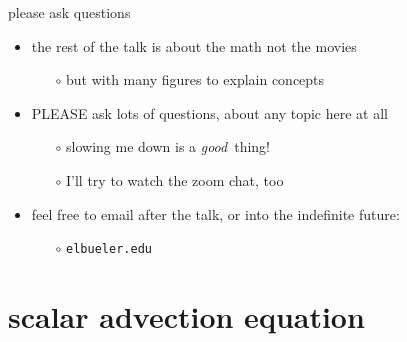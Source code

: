 \documentclass[10pt,dvipsnames,usepdftitle=false,
hyperref={pdftitle = {Finite volume methods},
    pdfauthor = {Ed Bueler}}]{beamer}
\begin{document}
\begin{frame}{please ask questions}

\begin{itemize}
\item the rest of the talk is about the math not the movies
    \begin{itemize}
    \item[$\circ$] but with many figures to explain concepts
    \end{itemize}
\item \alert{PLEASE} ask lots of questions, about any topic here at all
    \begin{itemize}
    \item[$\circ$] slowing me down is a \emph{good}\, thing!
    \item[$\circ$] I'll try to watch the zoom chat, too
    \end{itemize}
\item feel free to email after the talk, or into the indefinite future:
    \begin{itemize}
    \item[$\circ$] \texttt{elbueler\@@alaska.edu}
    \end{itemize}
\end{itemize}
\end{frame}



\section{scalar advection equation}
\end{document}
